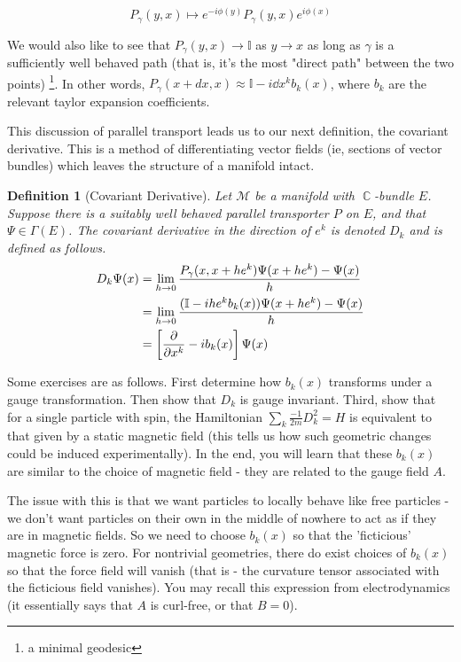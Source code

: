 \documentclass{article}
\DeclareMathOperator{\CC}{\mathbb{C}}
\newtheorem{defn}{Definition}
\begin{document}
\begin{equation}
P_\gamma(y,x) \mapsto e^{-i\phi(y)}P_\gamma(y,x) e^{i\phi(x)}
\end{equation}

We would also like to see that $P_\gamma(y,x) \to \mathbb{I}$ as $y \to x$ as long as $\gamma$ is a sufficiently well behaved path (that is, it's the most "direct path" between the two points) \footnote{a minimal geodesic}. In other words, $P_\gamma(x+dx,x) \approx \mathbb{I} - i \dd x^k b_k(x)$, where $b_k$ are the relevant taylor expansion coefficients. 

This discussion of parallel transport leads us to our next definition, the covariant derivative. This is a method of differentiating vector fields (ie, sections of vector bundles) which leaves the structure of a manifold intact.

\begin{defn}[Covariant Derivative]
Let $\mathcal{M}$ be a manifold with $\CC$-bundle $E$. Suppose there is a suitably well behaved parallel transporter $P$ on $E$, and that $\Psi \in \Gamma(E)$. The covariant derivative in the direction of $e^k$ is denoted $D_k$ and is defined as follows.
\begin{align}
D_k \Psi(x) &= \lim_{h \to 0} \frac{P_\gamma (x,x+h e^k) \Psi(x+he^k) - \Psi(x)}{h}\\
	&= \lim_{h \to 0}\frac{(\mathbb{I} - i h e^k b_k(x))\Psi(x+ he^k) - \Psi(x)}{h}\\
	&= \left[\pdv{x^k}-ib_k(x)\right]\Psi(x)
\end{align} 
\end{defn}

Some exercises are as follows. First determine how $b_k(x)$ transforms under a gauge transformation. Then show that $D_k$ is gauge invariant. Third, show that for a single particle with spin, the Hamiltonian $\sum_k \frac{-1}{2m} D_k^2 = H$ is equivalent to that given by a static magnetic field (this tells us how such geometric changes could be induced experimentally). In the end, you will learn that these $b_k(x)$ are similar to the choice of magnetic field - they are related to the gauge field $A$.

The issue with this is that we want particles to locally behave like free particles - we don't want particles on their own in the middle of nowhere to act as if they are in magnetic fields. So we need to choose $b_k(x)$ so that the 'ficticious' magnetic force is zero. For nontrivial geometries, there do exist choices of $b_k(x)$ so that the force field will vanish (that is - the curvature tensor associated with the ficticious field vanishes). You may recall this expression from electrodynamics (it essentially says that $A$ is curl-free, or that $B=0$).
\end{document}
